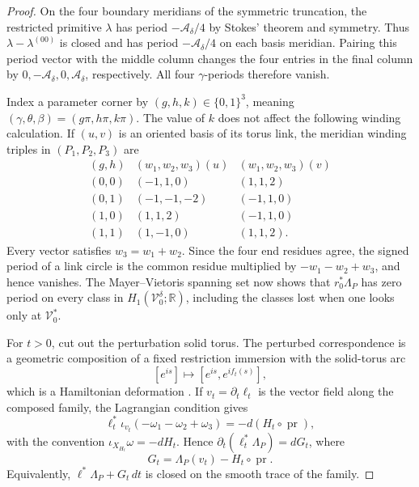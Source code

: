 \documentclass[11pt,reqno]{amsart}
\theoremstyle{plain}
\theoremstyle{definition}
\newcommand{\R}{\mathbb{R}}
\begin{document}
\begin{proof}
On the four boundary meridians of the symmetric truncation, the restricted primitive $\lambda$
has period $-\mathcal A_\delta/4$ by Stokes' theorem and symmetry.
Thus $\lambda-\lambda^{(00)}$ is closed and has period $-\mathcal A_\delta/4$ on each basis
meridian.  Pairing this period vector with the middle column changes the four entries in the final
column by $0,-\mathcal A_\delta,0,\mathcal A_\delta$, respectively.  All four
$\gamma$-periods therefore vanish.

Index a parameter corner by $(g,h,k)\in\{0,1\}^3$, meaning
$(\gamma,\theta,\beta)=(g\pi,h\pi,k\pi)$.  The value of $k$ does not affect the following winding
calculation.  If $(u,v)$ is an oriented basis of its torus link, the meridian winding triples in
$(P_1,P_2,P_3)$ are
\begin{equation}\label{eq:corner-link-table}
\begin{array}{c|c|c}
(g,h)&(w_1,w_2,w_3)(u)&(w_1,w_2,w_3)(v)\\ \hline
(0,0)&(-1,1,0)&(1,1,2)\\
(0,1)&(-1,-1,-2)&(-1,1,0)\\
(1,0)&(1,1,2)&(-1,1,0)\\
(1,1)&(1,-1,0)&(1,1,2).
\end{array}
\end{equation}
Every vector satisfies $w_3=w_1+w_2$.  Since the four end residues agree, the signed period of a
link circle is the common residue multiplied by $-w_1-w_2+w_3$, and hence vanishes.  The
Mayer--Vietoris spanning set now shows that $r_0^*\Lambda_P$ has zero period on every class in
$H_1(\mathcal V_0^\delta;\R)$, including the classes lost when one looks only at
$\mathcal V_0^*$.

For $t>0$, cut out the perturbation solid torus.  The perturbed correspondence is a geometric
composition of a fixed restriction immersion with the solid-torus arc
\[
 [e^{is}]\longmapsto[e^{is},e^{if_t(s)}],
\]
which is a Hamiltonian deformation \cite[Eq.~(6-4) and Sec.~6B]{CHK}.  If
$v_t=\partial_t\ell_t$ is the vector field along the composed family, the Lagrangian condition gives
\begin{equation}\label{eq:hamiltonian-flux}
 \ell_t^*\iota_{v_t}(-\omega_1-\omega_2+\omega_3)
 =-d(H_t\circ\operatorname{pr}),
\end{equation}
with the convention $\iota_{X_{H_t}}\omega=-dH_t$.  Hence
$\partial_t(\ell_t^*\Lambda_P)=dG_t$, where
\[
 G_t=\Lambda_P(v_t)-H_t\circ\operatorname{pr}.
\]
Equivalently, $\ell^*\Lambda_P+G_t\,dt$ is closed on the smooth trace of the family.


\end{proof}
\end{document}
